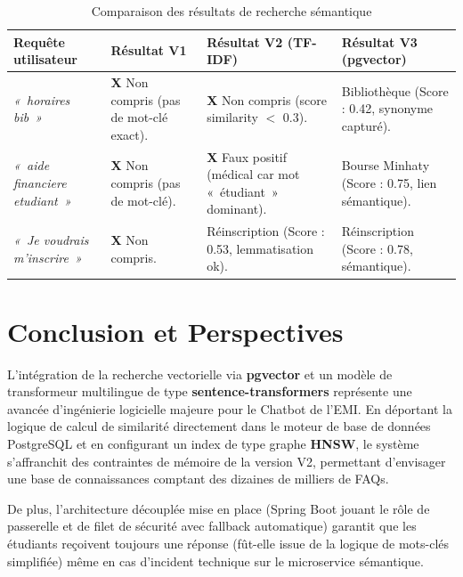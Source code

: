 \documentclass[11pt,a4paper]{article}
\newcommand{\cross}{\textcolor{red!80!black}{\textbf{\textsf{X}}}}
\newcommand{\checkmarktext}{\textcolor{green!60!black}{\checkmark}}
\begin{document}
\begin{table}[H]
\centering
\small
\begin{tabular}{p{3.5cm}p{3.5cm}p{4cm}p{3.5cm}}
\toprule
\textbf{Requête utilisateur} & \textbf{Résultat V1} & \textbf{Résultat V2 (TF-IDF)} & \textbf{Résultat V3 (pgvector)} \\
\midrule
\rowcolor{gray!10}
\textit{«~horaires bib~»} & \cross{} Non compris (pas de mot-clé exact). & \cross{} Non compris (score similarity $<$ 0.3). & \checkmarktext{} Bibliothèque (Score : 0.42, synonyme capturé). \\
\textit{«~aide financiere etudiant~»} & \cross{} Non compris (pas de mot-clé). & \cross{} Faux positif (médical car mot «~étudiant~» dominant). & \checkmarktext{} Bourse Minhaty (Score : 0.75, lien sémantique). \\
\rowcolor{gray!10}
\textit{«~Je voudrais m'inscrire~»} & \cross{} Non compris. & \checkmarktext{} Réinscription (Score : 0.53, lemmatisation ok). & \checkmarktext{} Réinscription (Score : 0.78, sémantique). \\
\bottomrule
\end{tabular}
\caption{Comparaison des résultats de recherche sémantique}
\end{table}

\clearpage

\section[Conclusion]{Conclusion et Perspectives}

L'intégration de la recherche vectorielle via \textbf{pgvector} et un modèle de transformeur multilingue de type \textbf{sentence-transformers} représente une avancée d'ingénierie logicielle majeure pour le Chatbot de l'EMI. En déportant la logique de calcul de similarité directement dans le moteur de base de données PostgreSQL et en configurant un index de type graphe \textbf{HNSW}, le système s'affranchit des contraintes de mémoire de la version V2, permettant d'envisager une base de connaissances comptant des dizaines de milliers de FAQs.

De plus, l'architecture découplée mise en place (Spring Boot jouant le rôle de passerelle et de filet de sécurité avec fallback automatique) garantit que les étudiants reçoivent toujours une réponse (fût-elle issue de la logique de mots-clés simplifiée) même en cas d'incident technique sur le microservice sémantique.
\end{document}
